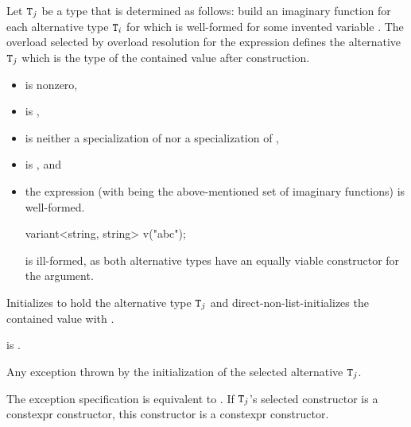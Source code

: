 \begin{itemdescr}
\pnum
Let $\texttt{T}_j$ be a type that is determined as follows:
build an imaginary function 
for each alternative type $\texttt{T}_i$
for which  
is well-formed for some invented variable .
The overload  selected by overload
resolution for the expression  defines
the alternative $\texttt{T}_j$ which is the type of the contained value after
construction.

\pnum
\constraints
\begin{itemize}
\item
{} is nonzero,

\item
{} is ,

\item
{} is neither
a specialization of  nor
a specialization of ,

\item
{} is , and

\item
the expression \brk{}
(with  being the above-mentioned set of
imaginary functions) is well-formed.
\begin{note}
\begin{codeblock}
variant<string, string> v("abc");
\end{codeblock}
is ill-formed, as both alternative types have an equally viable constructor
for the argument.
\end{note}
\end{itemize}

\pnum
\effects
Initializes  to hold the alternative type $\texttt{T}_j$ and
direct-non-list-initializes the contained value with .

\pnum
\ensures
{} is .

\pnum
\throws
Any exception thrown by the initialization of the selected alternative $\texttt{T}_j$.

\pnum
\remarks
The exception specification is equivalent to
.
If $\texttt{T}_j$'s selected constructor is a constexpr constructor,
this constructor is a constexpr constructor.
\end{itemdescr}


